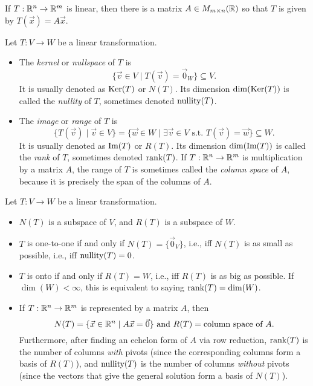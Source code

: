 \begin{theorem}
	If $T : {\mathbb{R}}^n \rightarrow {\mathbb{R}}^m$ is linear, then there is a matrix $A \in M_{m
	\times n}({\mathbb{R}})$ so that $T$ is given by $T(\vec{x}) = A\vec{x}$.
\end{theorem}

\begin{definition}
	Let $T : V \rightarrow W$ be a linear transformation.
	\begin{itemize}
		\item The \emph{kernel} or \emph{nullspace} of $T$ is
			\[
				\{\vec{v} \in V \mid T(\vec{v}) = \vec{0}_W\} \subseteq V.
			\]
			It is usually denoted as $\text{Ker}(T)$ or $N(T)$. Its dimension
			$\dim(\text{Ker}(T))$ is called the \emph{nullity} of $T$, sometimes denoted
			$\text{nullity}(T)$.
		\item The \emph{image} or \emph{range} of $T$ is
			\[
				\{T(\vec{v}) \mid \vec{v} \in V\} = \{\vec{w} \in W \mid \exists \vec{v}
				\in V \text{ s.t. } T(\vec{v}) = \vec{w}\} \subseteq W.
			\]
			It is usually denoted as $\text{Im}(T)$ or $R(T)$. Its dimension
			$\dim(\text{Im}(T))$ is called the \emph{rank} of $T$, sometimes denoted
			$\text{rank}(T)$. If $T : {\mathbb{R}}^n \rightarrow {\mathbb{R}}^m$ is multiplication by a matrix
			$A$, the range of $T$ is sometimes called the \emph{column space} of $A$,
			because it is precisely the span of the columns of $A$.
	\end{itemize}
\end{definition}

\begin{facts}
	Let $T : V \rightarrow W$ be a linear transformation.
	\begin{itemize}
		\item $N(T)$ is a subspace of $V$, and $R(T)$ is a subspace of $W$.
		\item $T$ is one-to-one if and only if $N(T) = \{\vec{0}_V\}$, i.e., iff
			$N(T)$ is as small as possible, i.e., iff $\text{nullity}(T) = 0$.
		\item $T$ is onto if and only if $R(T) = W$, i.e., iff $R(T)$ is as big as
			possible. If $\dim(W) < \infty$, this is equivalent to saying $\text{rank}(T) =
			\dim(W)$.
		\item If $T : {\mathbb{R}}^n \rightarrow {\mathbb{R}}^m$ is represented by a matrix $A$, then
			\[
				N(T) = \{\vec{x} \in {\mathbb{R}}^n \mid A\vec{x} = \vec{0}\} \text{ and } R(T) =
				\text{column space of $A$}.
			\]
			Furthermore, after finding an echelon form of $A$ via row reduction,
			$\text{rank}(T)$ is the number of columns \emph{with} pivots (since the
			corresponding columns form a basis of $R(T)$), and $\text{nullity}(T)$ is the
			number of columns \emph{without} pivots (since the vectors that give the
			general solution form a basis of $N(T)$).
	\end{itemize}
\end{facts}

